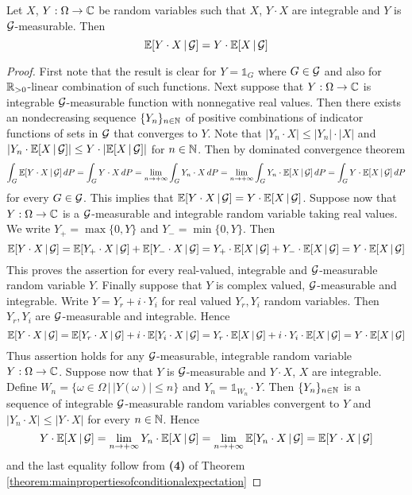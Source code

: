 \begin{theorem}\label{theorem:multiplicationofconditionalexpectation}
Let $X$, $Y:\Omega \rightarrow {\mathbb C}$ be random variables such that $X$, $Y\cdot X$ are integrable and $Y$ is ${\mathcal G}$-measurable. Then
$${\mathbb E}[Y\cdot X\,|\,{\mathcal G}] = Y\cdot {\mathbb E}[X\,|\,{\mathcal G}]$$
\end{theorem}
\begin{proof}
First note that the result is clear for $Y = \mathbb{1}_G$ where $G\in {\mathcal G}$ and also for ${\mathbb R}_{>0}$-linear combination of such functions. Next suppose that $Y:\Omega \rightarrow {\mathbb C}$ is integrable ${\mathcal G}$-measurable function with nonnegative real values. Then there exists an nondecreasing sequence $\{Y_n\}_{n\in {\mathbb N}}$ of positive combinations of indicator functions of sets in ${\mathcal G}$ that converges to $Y$. Note that $|Y_n\cdot X|\leq |Y_n|\cdot |X|$ and $|Y_n\cdot {\mathbb E}[X\,|\,{\mathcal G}]|\leq Y\cdot |{\mathbb E}[X\,|\,{\mathcal G}]|$ for $n\in {\mathbb N}$. Then by dominated convergence theorem
$$\int_G {\mathbb E}[Y\cdot X\,|\,{\mathcal G}]\,dP = \int_G Y\cdot X\,dP = \lim_{n\rightarrow +\infty}\int_G Y_n\cdot X\,dP = \lim_{n\rightarrow +\infty} \int_G Y_n\cdot {\mathbb E}[X\,|\,{\mathcal G}]\,dP = \int_G Y\cdot {\mathbb E}[X\,|\,{\mathcal G}]\,dP$$
for every $G\in {\mathcal G}$. This implies that ${\mathbb E}[Y\cdot X\,|\,{\mathcal G}] = Y\cdot {\mathbb E}[X\,|\,{\mathcal G}]$. Suppose now that $Y:\Omega \rightarrow {\mathbb C}$ is a ${\mathcal G}$-measurable and integrable random variable taking real values. We write $Y_+ = \max\{0,Y\}$ and $Y_- = \min\{0,Y\}$. Then
$${\mathbb E}[Y\cdot X\,|\,{\mathcal G}] = {\mathbb E}[Y_+\cdot X\,|\,{\mathcal G}]+{\mathbb E}[Y_-\cdot X\,|\,{\mathcal G}]= Y_+\cdot{\mathbb E}[ X\,|\,{\mathcal G}] + Y_-\cdot{\mathbb E}[ X\,|\,{\mathcal G}] = Y\cdot {\mathbb E}[X\,|\,{\mathcal G}]$$
This proves the assertion for every real-valued, integrable and ${\mathcal G}$-measurable random variable $Y$. Finally suppose that $Y$ is complex valued, ${\mathcal G}$-measurable and integrable. Write $Y = Y_r + i\cdot Y_i$ for real valued $Y_r, Y_i$ random variables. Then $Y_r, Y_i$ are ${\mathcal G}$-measurable and integrable. Hence
$${\mathbb E}[Y\cdot X\,|\,{\mathcal G}] = {\mathbb E}[Y_r\cdot X\,|\,{\mathcal G}]+i\cdot {\mathbb E}[Y_i\cdot X\,|\,{\mathcal G}]= Y_r\cdot{\mathbb E}[ X\,|\,{\mathcal G}] +i\cdot Y_i\cdot{\mathbb E}[ X\,|\,{\mathcal G}] = Y\cdot {\mathbb E}[X\,|\,{\mathcal G}]$$
Thus assertion holds for any ${\mathcal G}$-measurable, integrable random variable $Y:\Omega \rightarrow {\mathbb C}$. Suppose now that $Y$ is ${\mathcal G}$-measurable and $Y\cdot X$, $X$ are integrable. Define $W_n=\{\omega \in \Omega\,|\,|Y(\omega)|\leq n\}$ and $Y_n = \mathbb{1}_{W_n}\cdot Y$. Then $\{Y_n\}_{n\in {\mathbb N}}$ is a sequence of integrable ${\mathcal G}$-measurable random variables convergent to $Y$ and $|Y_n\cdot X|\leq |Y\cdot X|$ for every $n\in {\mathbb N}$. Hence
$$Y\cdot {\mathbb E}[X\,|\,{\mathcal G}] = \lim_{n\rightarrow +\infty}Y_n\cdot {\mathbb E}[X\,|\,{\mathcal G}] = \lim_{n\rightarrow +\infty}{\mathbb E}[Y_n\cdot X\,|\,{\mathcal G}] = {\mathbb E}[Y\cdot X\,|\,{\mathcal G}]$$
and the last equality follow from \textbf{(4)} of Theorem \ref{theorem:mainpropertiesofconditionalexpectation}
\end{proof}

